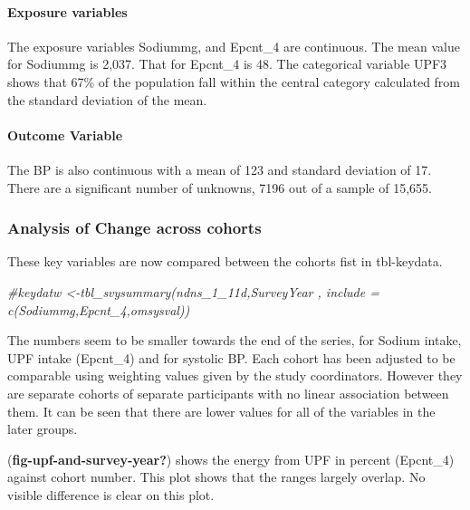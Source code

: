 \documentclass[
]{article}
\newenvironment{Shaded}{\begin{snugshade}}{\end{snugshade}}
\newcommand{\CommentTok}[1]{\textcolor[rgb]{0.56,0.35,0.01}{\textit{#1}}}
\begin{document}
\hypertarget{exposure-variables}{%
\paragraph{Exposure variables}\label{exposure-variables}}

The exposure variables Sodiummg, and Epcnt\_4 are continuous. The mean
value for Sodiummg is 2,037. That for Epcnt\_4 is 48. The categorical
variable UPF3 shows that 67\% of the population fall within the central
category calculated from the standard deviation of the mean.

\hypertarget{outcome-variable}{%
\paragraph{Outcome Variable}\label{outcome-variable}}

The BP is also continuous with a mean of 123 and standard deviation of
17. There are a significant number of unknowns, 7196 out of a sample of
15,655.

\hypertarget{analysis-of-change-across-cohorts}{%
\subsubsection{Analysis of Change across
cohorts}\label{analysis-of-change-across-cohorts}}

These key variables are now compared between the cohorts fist in
tbl-keydata.

\begin{Shaded}
\begin{Highlighting}[]
\CommentTok{\#keydatw \textless{}{-}tbl\_svysummary(ndns\_1\_11d,SurveyYear , include = c(Sodiummg,Epcnt\_4,omsysval))}
\end{Highlighting}
\end{Shaded}

The numbers seem to be smaller towards the end of the series, for Sodium
intake, UPF intake (Epcnt\_4) and for systolic BP. Each cohort has been
adjusted to be comparable using weighting values given by the study
coordinators. However they are separate cohorts of separate participants
with no linear association between them. It can be seen that there are
lower values for all of the variables in the later groups.

(\textbf{fig-upf-and-survey-year?}) shows the energy from UPF in percent
(Epcnt\_4) against cohort number. This plot shows that the ranges
largely overlap. No visible difference is clear on this plot.
\end{document}

